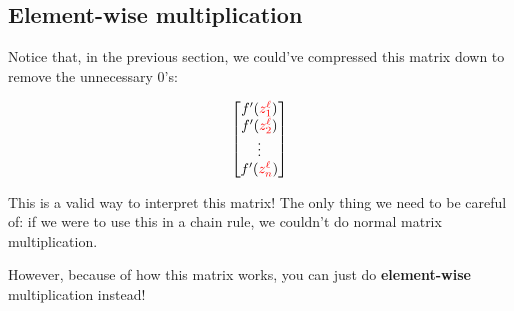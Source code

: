     
    \subsection{Element-wise multiplication}

        Notice that, in the previous section, we could've compressed this matrix down to remove the unnecessary 0's:
        
        \begin{equation}
            \begin{bmatrix}
                f'({\textcolor{red}{z_1^\ell}})\\
                f'({\textcolor{red}{z_2^\ell}})\\
                \vdots \\
                f'({\textcolor{red}{z_n^\ell}})
            \end{bmatrix}
        \end{equation}
        
        This is a valid way to interpret this matrix! The only thing we need to be careful of: if we were to use this in a chain rule, we couldn't do normal matrix multiplication.
        
        However, because of how this matrix works, you can just do \textbf{element-wise} multiplication instead!
            
